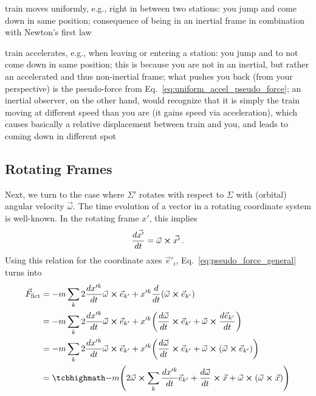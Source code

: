 \documentclass[../class_mech_main.tex]{subfiles}
\begin{document}
\begin{ex}
	train moves uniformly, e.g., right in between two stations: you jump and come down in same position; consequence of being in an inertial frame in combination with Newton's first law

	train accelerates, e.g., when leaving or entering a station: you jump and to not come down in same position; this is because you are not in an inertial, but rather an accelerated and thus non-inertial frame; what pushes you back (from your perspective) is the pseudo-force from Eq.~\eqref{eq:uniform_accel_pseudo_force}; an inertial observer, on the other hand, would recognize that it is simply the train moving at different speed than you are (it gains speed via acceleration), which causes basically a relative displacement between train and you, and leads to coming down in different spot
\end{ex}




        \subsection{Rotating Frames}
Next, we turn to the case where $\Sigma'$ rotates with respect to $\Sigma$ with (orbital) angular velocity $\vec{\omega}$. The time evolution of a vector in a rotating coordinate system is well-known.  In the rotating frame $x'$, this implies
\begin{equation}
    \dv{\vec{x'}}{t} = \vec{\omega} \cross \vec{x'} \, .
\end{equation}
Using this relation for the coordinate axes $\vec{e}'_i$, Eq.~\eqref{eq:pseudo_force_general} turns into
\begin{align}
	\vec{F}_\mathrm{fict} &= - m \sum_k 2 \dv{x'^k}{t} \vec{\omega} \cross \unitvec{k'} + x'^k \dv{t} \qty(\vec{\omega} \cross \unitvec{k'})
	\notag\\
	&= - m \sum_k 2 \dv{x'^k}{t} \vec{\omega} \cross \unitvec{k'} + x'^k \qty(\dv{\vec{\omega}}{t} \cross \unitvec{k'} + \vec{\omega} \cross \dv{\unitvec{k'}}{t})
	\notag\\
	&= - m \sum_k 2 \dv{x'^k}{t} \vec{\omega} \cross \unitvec{k'} + x'^k \qty(\dv{\vec{\omega}}{t} \cross \unitvec{k'} + \vec{\omega} \cross (\vec{\omega} \cross \unitvec{k'}))
	\notag\\
	&= \eqbox{
		- m \qty(2 \vec{\omega} \cross \sum_k \dv{x'^k}{t} \unitvec{k'} + \dv{\vec{\omega}}{t} \cross \vec{x} + \vec{\omega} \cross (\vec{\omega} \cross \vec{x}))
	}
    \label{eq:pseudo_force_rot_frame}
\end{align}
\end{document}
